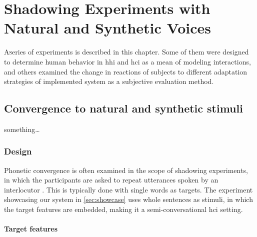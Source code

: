 \chapter{Shadowing Experiments with Natural and Synthetic Voices}
\label{chap:shadowing_experiment_with_natural_and_synthetic_voices}

\lettrine{A} series of experiments is described in this chapter.
Some of them were designed to determine human behavior in \acl{hhi} and \ac{hci} as a mean of modeling interactions, and others examined the change in reactions of subjects to different adaptation strategies of implemented system as a subjective evaluation method.

\pagebreak

\section{Convergence to natural and synthetic stimuli}
\label{sec:convergence_to_natural_and_synthetic_stimuli}

something\ldots

\subsection{Design}
\label{subsec:design_HCIConv}

Phonetic convergence is often examined in the scope of shadowing experiments, in which the participants are asked to repeat utterances spoken by an interlocutor \citep[e.g.,][]{Pardo2017phonetic, Dias2016visibilivty, Walker2015repeat, Shockley2004imitation}.
This is typically done with single words as targets.
The experiment showcasing our system in \cref{sec:showcase} uses whole sentences as stimuli, in which the target features are embedded, making it a semi-conversational \ac{hci} setting.

\subsubsection{Target features}
\label{subsec:target_features_HCIConv}


